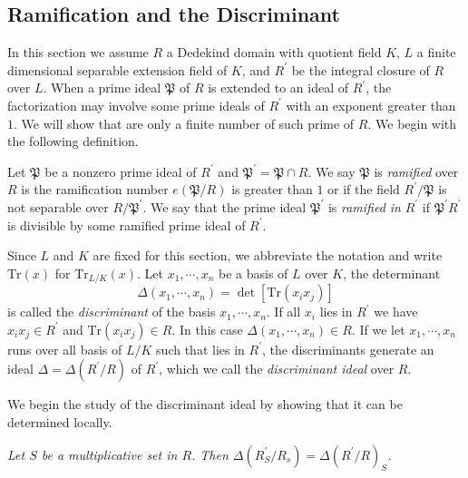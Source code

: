 \subsection{Ramification and the Discriminant}
In this section we assume $R$ a Dedekind domain with quotient field $K$, $L$ a finite dimensional separable extension field of $K$, and $R^\prime$ be the integral closure of $R$ over $L$. When a prime ideal $\mathfrak{P}$ of $R$ is extended to an ideal of $R^\prime$, the factorization may involve some prime ideals of $R^\prime$ with an exponent greater than $1$. We will show that are only a finite number of such prime of $R$. We begin with the following definition.
\begin{definition}
Let $\mathfrak{P}$ be a nonzero prime ideal of $R^\prime$ and $\mathfrak{P}^\prime=\mathfrak{P}\cap R$. We say $\mathfrak{P}$ is \textit{ramified} over $R$ is the ramification number $e(\mathfrak{P}/R)$ is greater than $1$ or if the field $R^\prime/\mathfrak{P}$ is not separable over $R/\mathfrak{P}^\prime$. We say that the prime ideal $\mathfrak{P}^\prime$ is \textit{ramified in} $R^\prime$ if $\mathfrak{P}^\prime R^\prime$ is divisible by some ramified prime ideal of $R^\prime$.
\end{definition}
Since $L$ and $K$ are fixed for this section, we abbreviate the notation and write $\mathrm{Tr}(x)$ for $\mathrm{Tr}_{L/K}(x)$. Let $x_1,\cdots,x_n$ be a basis of $L$ over $K$, the determinant 
$$
\Delta \left( x_1,\cdots ,x_n \right) =\det \left[ \mathrm{Tr}\left( x_ix_j \right) \right] 
$$
is called the \textit{discriminant} of the basis $x_1,\cdots,x_n$. If all $x_i$ lies in $R^\prime$ we have $x_ix_j\in R^\prime$ and $\mathrm{Tr}(x_ix_j)\in R$. In this case $\Delta(x_1,\cdots,x_n)\in R$. If we let $x_1,\cdots,x_n$ runs over all basis of $L/K$ such that lies in $R^\prime$, the discriminants generate an ideal $\Delta=\Delta(R^\prime/R)$ of $R^\prime$, which we call the \textit{discriminant ideal} over $R$.\par
We begin the study of the discriminant ideal by showing that it can be determined locally.
\begin{lemma}\em
Let $S$ be a multiplicative set in $R$. Then $\Delta \left( R_{S}^{\prime}/R_s \right) =\Delta \left( R^{\prime}/R \right) _S$.
\end{lemma}
